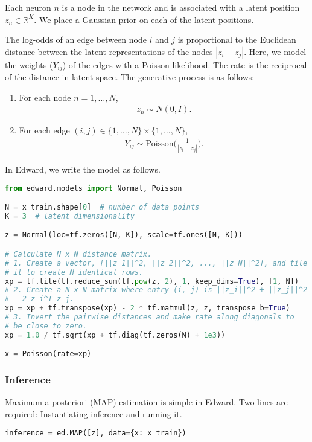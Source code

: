 Each neuron $n$ is a node in the network and is associated with a latent
position $z_n\in\mathbb{R}^K$.
We place a Gaussian prior on each of the latent positions.

The log-odds of an edge between node $i$ and
$j$ is proportional to the Euclidean distance between the latent
representations of the nodes $|z_i- z_j|$. Here, we
model the weights ($Y_{ij}$) of the edges with a Poisson likelihood.
The rate is the reciprocal of the distance in latent space. The
generative process is as follows:

\begin{enumerate}
\item
For each node $n=1,\ldots,N$,
\begin{align}
z_n \sim N(0,I).
\end{align}
\item
For each edge $(i,j)\in\{1,\ldots,N\}\times\{1,\ldots,N\}$,
\begin{align}
Y_{ij} \sim \text{Poisson}\Bigg(\frac{1}{|z_i - z_j|}\Bigg).
\end{align}
\end{enumerate}

In Edward, we write the model as follows.
\begin{lstlisting}[language=Python]
from edward.models import Normal, Poisson

N = x_train.shape[0]  # number of data points
K = 3  # latent dimensionality

z = Normal(loc=tf.zeros([N, K]), scale=tf.ones([N, K]))

# Calculate N x N distance matrix.
# 1. Create a vector, [||z_1||^2, ||z_2||^2, ..., ||z_N||^2], and tile
# it to create N identical rows.
xp = tf.tile(tf.reduce_sum(tf.pow(z, 2), 1, keep_dims=True), [1, N])
# 2. Create a N x N matrix where entry (i, j) is ||z_i||^2 + ||z_j||^2
# - 2 z_i^T z_j.
xp = xp + tf.transpose(xp) - 2 * tf.matmul(z, z, transpose_b=True)
# 3. Invert the pairwise distances and make rate along diagonals to
# be close to zero.
xp = 1.0 / tf.sqrt(xp + tf.diag(tf.zeros(N) + 1e3))

x = Poisson(rate=xp)
\end{lstlisting}

\subsubsection{Inference}

Maximum a posteriori (MAP) estimation is simple in Edward. Two lines are
required: Instantiating inference and running it.
\begin{lstlisting}[language=Python]
inference = ed.MAP([z], data={x: x_train})
\end{lstlisting}


